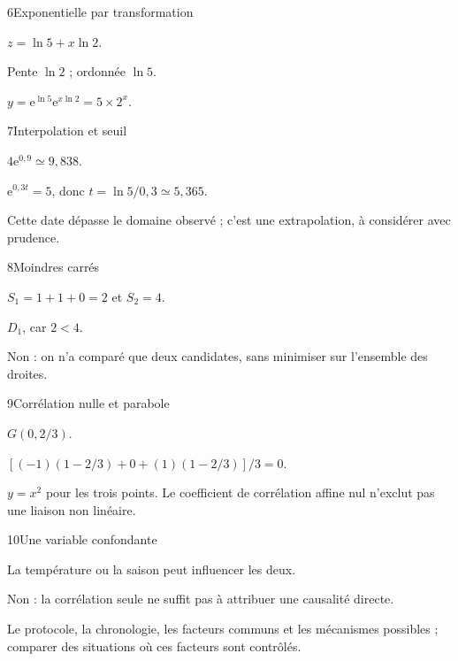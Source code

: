 \begin{corrige}{6}{Exponentielle par transformation}
\begin{questions}
\item $z=\ln5+x\ln2$.
\item Pente $\ln2$ ; ordonnée $\ln5$.
\item $y=\mathrm e^{\ln5}\mathrm e^{x\ln2}=5\times2^x$.
\end{questions}
\end{corrige}
\begin{corrige}{7}{Interpolation et seuil}
\begin{questions}
\item $4\mathrm e^{0{,}9}\simeq9{,}838$.
\item $\mathrm e^{0{,}3t}=5$, donc $t=\ln5/0{,}3\simeq5{,}365$.
\item Cette date dépasse le domaine observé ; c’est une extrapolation, à considérer avec prudence.
\end{questions}
\end{corrige}
\begin{corrige}{8}{Moindres carrés}
\begin{questions}
\item $S_1=1+1+0=2$ et $S_2=4$.
\item $D_1$, car $2<4$.
\item Non : on n’a comparé que deux candidates, sans minimiser sur l’ensemble des droites.
\end{questions}
\end{corrige}
\begin{corrige}{9}{Corrélation nulle et parabole}
\begin{questions}
\item $G(0,2/3)$.
\item $[(-1)(1-2/3)+0+(1)(1-2/3)]/3=0$.
\item $y=x^2$ pour les trois points. Le coefficient de corrélation affine nul n’exclut pas une liaison non linéaire.
\end{questions}
\end{corrige}
\begin{corrige}{10}{Une variable confondante}
\begin{questions}
\item La température ou la saison peut influencer les deux.
\item Non : la corrélation seule ne suffit pas à attribuer une causalité directe.
\item Le protocole, la chronologie, les facteurs communs et les mécanismes possibles ; comparer des situations où ces facteurs sont contrôlés.
\end{questions}
\end{corrige}
